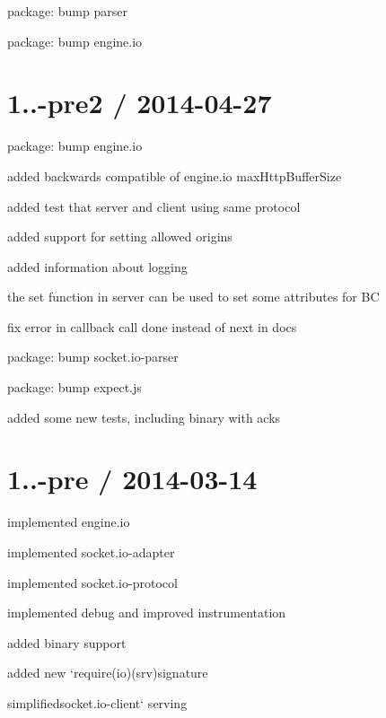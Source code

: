\begin{DoxyItemize}
\item package\+: bump parser
\item package\+: bump engine.\+io
\end{DoxyItemize}

\section*{1..-\/pre2 / 2014-\/04-\/27 }


\begin{DoxyItemize}
\item package\+: bump {\ttfamily engine.\+io}
\item added backwards compatible of engine.\+io max\+Http\+Buffer\+Size
\item added test that server and client using same protocol
\item added support for setting allowed origins
\item added information about logging
\item the set function in server can be used to set some attributes for BC
\item fix error in callback call \textquotesingle{}done\textquotesingle{} instead of \textquotesingle{}next\textquotesingle{} in docs
\item package\+: bump {\ttfamily socket.\+io-\/parser}
\item package\+: bump {\ttfamily expect.\+js}
\item added some new tests, including binary with acks
\end{DoxyItemize}

\section*{1..-\/pre / 2014-\/03-\/14 }


\begin{DoxyItemize}
\item implemented {\ttfamily engine.\+io}
\item implemented {\ttfamily socket.\+io-\/adapter}
\item implemented {\ttfamily socket.\+io-\/protocol}
\item implemented {\ttfamily debug} and improved instrumentation
\item added binary support
\item added new `require(\textquotesingle{}io\textquotesingle{})(srv){\ttfamily signature}
\item {\ttfamily simplified}socket.\+io-\/client` serving
\end{DoxyItemize}

